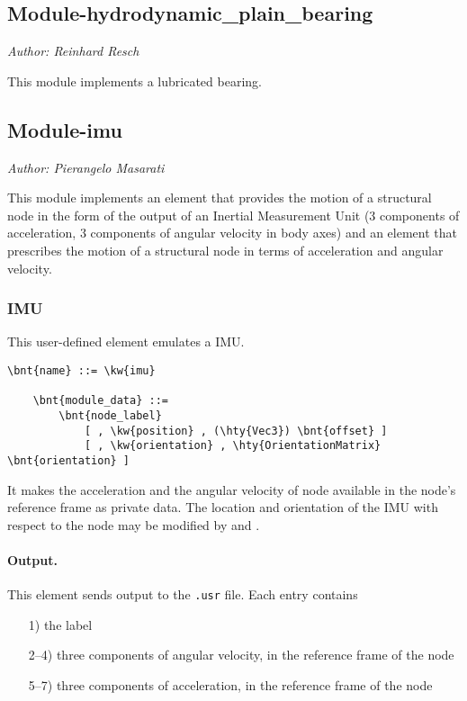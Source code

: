 \subsection{Module-hydrodynamic\_plain\_bearing}
\emph{Author: Reinhard Resch}

\noindent
This module implements a lubricated bearing.

\subsection{Module-imu}
\emph{Author: Pierangelo Masarati}

\noindent
This module implements an element that provides the motion of a structural node
in the form of the output of an Inertial Measurement Unit
(3 components of acceleration, 3 components of angular velocity in body axes)
and an element that prescribes the motion of a structural node
in terms of acceleration and angular velocity.

\subsubsection{IMU}
This user-defined element emulates a IMU.
\begin{Verbatim}[commandchars=\\\{\}]
    \bnt{name} ::= \kw{imu}

    \bnt{module_data} ::=
        \bnt{node_label}
            [ , \kw{position} , (\hty{Vec3}) \bnt{offset} ]
            [ , \kw{orientation} , \hty{OrientationMatrix} \bnt{orientation} ]
\end{Verbatim}
It makes the acceleration and the angular velocity of node 
available in the node's reference frame as private data.
The location and orientation of the IMU with respect to the node may be modified
by  and .

\paragraph{Output.}
This element sends output to the \texttt{.usr} file.
Each entry contains
\begin{itemize}
\item[1)] the label
\item[2--4)] three components of angular velocity, in the reference frame of the node
\item[5--7)] three components of acceleration, in the reference frame of the node
\end{itemize}

